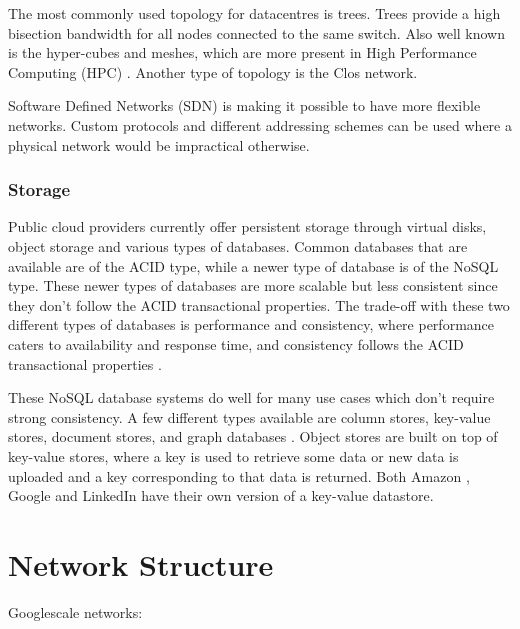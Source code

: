 \documentclass[fullapage,12pt]{article}
\begin{document}
The most commonly used topology for datacentres is trees. Trees provide a high bisection bandwidth for all nodes connected to the same switch. Also well known is the hyper-cubes and meshes, which are more present in High Performance Computing (HPC) \cite{Jennings2015}. Another type of topology is the Clos network. %

Software Defined Networks (SDN) is making it possible to have more flexible networks. Custom protocols and different addressing schemes can be used where a physical network would be impractical otherwise.

\subsubsection{Storage}


Public cloud providers currently offer persistent storage through virtual disks, object storage and various types of databases. Common databases that are available are of the ACID type, while a newer type of database is of the NoSQL type. These newer types of databases are more scalable but less consistent since they don't follow the ACID transactional properties. The trade-off with these two different types of databases is performance and consistency, where performance caters to availability and response time, and consistency follows the ACID transactional properties \cite{Jennings2015}.

These NoSQL database systems do well for many use cases which don't require strong consistency. A few different types available are column stores, key-value stores, document stores, and graph databases \cite{graphDB2013}. Object stores are built on top of key-value stores, where a key is used to retrieve some data or new data is uploaded and a key corresponding to that data is returned. Both Amazon \cite{dynamodb}, Google \cite{cassandra} and LinkedIn \cite{voldemort} have their own version of a key-value datastore.






\section{Network Structure}

Googlescale networks: \cite{singh2015jupiter} %
\end{document}
